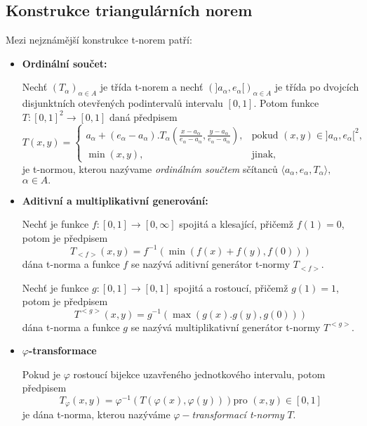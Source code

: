 \subsection{Konstrukce triangulárních norem}

Mezi nejznámější konstrukce t-norem patří:
\begin{itemize}
    \item \textbf{Ordinální součet:}
    \begin{definition}
    \cite{hlinena}
        Nech\v t $(T_\alpha)_{\alpha \in A}$ je třída t-norem a
        nech\v t $(]a_\alpha,e_\alpha[)_{\alpha \in A}$ je třída po dvojcích
        disjunktních otevřených podinterval\r u intervalu $[0,1].$ Potom funkce
        \hbox{$T:[0,1]^2\rightarrow [0,1]$} daná předpisem
        $$T(x,y)=\begin{cases} a_\alpha + (e_\alpha - a_\alpha ).T_\alpha (\frac
        {x-a_\alpha}{e_\alpha - a_\alpha}, \frac {y-a_\alpha}{e_\alpha - a_\alpha}),
        &\mbox {pokud $(x,y) \in ]a_\alpha ,e_\alpha [^2$,}
        \\\min(x,y), &\mbox {jinak,} \end{cases}$$
        je t-normou, kterou nazývame {\em ordinálním součtem} sčítanc\r u $\langle a_\alpha ,e_\alpha
        ,T_\alpha \rangle,$ \mbox{$ \alpha \in A.$}
    \end{definition}
    \item \textbf{Aditivní a multiplikativní generování:}
    \begin{definition}
        \cite{hlinena}
        Nech\v t je funkce $f:[0,1] \to [0,\infty]$ spojitá a klesající, přičemž
        $f(1)=0$, potom je předpisem
        $$ T_{<f>}(x,y)=f^{-1}(\min(f(x)+f(y),f(0)))$$
        dána t-norma a funkce $f$ se nazývá aditivní generátor t-normy
        $T_{<f>}.$
        
        Nech\v t je funkce $g:[0,1] \to [0,1]$ spojitá a rostoucí, přičemž
        $g(1)=1$, potom je předpisem
        $$ T^{<g>}(x,y)=g^{-1}(\max(g(x).g(y),g(0)))$$
        dána t-norma a funkce $g$ se nazývá multiplikativní generátor t-normy
        $T^{<g>}.$
    \end{definition}
    \item \textbf{$\varphi$-transformace}
    \begin{definition}
        \cite{hlinena}
        Pokud je $\varphi$ rostoucí bijekce uzavřeného jednotkového intervalu, potom
        předpisem
        $$T_\varphi (x,y)=\varphi ^{-1}(T(\varphi(x),\varphi(y))) \text {pro $(x,y)
        \in [0,1]$}$$
        je dána t-norma, kterou nazýváme $\varphi-${\em transformací t-normy}
        $T.$
    \end{definition}
\end{itemize}

